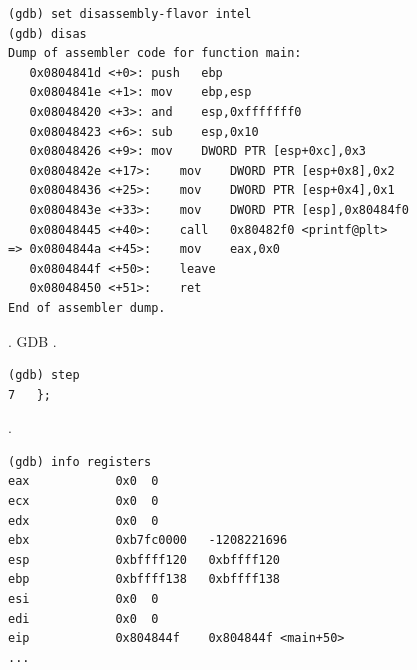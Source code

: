 \begin{lstlisting}
(gdb) set disassembly-flavor intel
(gdb) disas
Dump of assembler code for function main:
   0x0804841d <+0>:	push   ebp
   0x0804841e <+1>:	mov    ebp,esp
   0x08048420 <+3>:	and    esp,0xfffffff0
   0x08048423 <+6>:	sub    esp,0x10
   0x08048426 <+9>:	mov    DWORD PTR [esp+0xc],0x3
   0x0804842e <+17>:	mov    DWORD PTR [esp+0x8],0x2
   0x08048436 <+25>:	mov    DWORD PTR [esp+0x4],0x1
   0x0804843e <+33>:	mov    DWORD PTR [esp],0x80484f0
   0x08048445 <+40>:	call   0x80482f0 <printf@plt>
=> 0x0804844a <+45>:	mov    eax,0x0
   0x0804844f <+50>:	leave  
   0x08048450 <+51>:	ret    
End of assembler dump.
\end{lstlisting}

.
\ac{GDB} .

\begin{lstlisting}
(gdb) step
7	};
\end{lstlisting}

\EAX {}.

\begin{lstlisting}
(gdb) info registers
eax            0x0	0
ecx            0x0	0
edx            0x0	0
ebx            0xb7fc0000	-1208221696
esp            0xbffff120	0xbffff120
ebp            0xbffff138	0xbffff138
esi            0x0	0
edi            0x0	0
eip            0x804844f	0x804844f <main+50>
...
\end{lstlisting}
\fi
\fi
